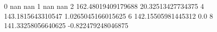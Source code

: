 0 nan nan
1 nan nan
2 162.48019409179688 20.32513427734375
4 143.1815643310547 1.0265045166015625
6 142.15505981445312 0.0
8 141.33258056640625 -0.822479248046875
